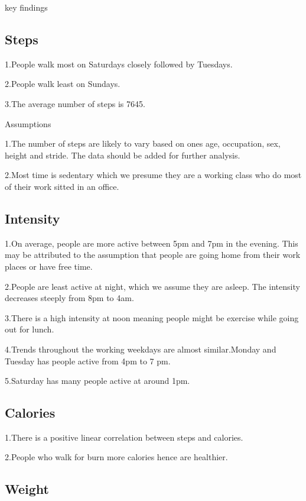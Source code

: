\documentclass[
]{article}
\begin{document}
key findings

\hypertarget{steps}{%
\subsection{Steps}\label{steps}}

1.People walk most on Saturdays closely followed by Tuesdays.

2.People walk least on Sundays.

3.The average number of steps is 7645.

Assumptions

1.The number of steps are likely to vary based on ones age, occupation,
sex, height and stride. The data should be added for further analysis.

2.Most time is sedentary which we presume they are a working class who
do most of their work sitted in an office.

\hypertarget{intensity}{%
\subsection{Intensity}\label{intensity}}

1.On average, people are more active between 5pm and 7pm in the evening.
This may be attributed to the assumption that people are going home from
their work places or have free time.

2.People are least active at night, which we assume they are asleep. The
intensity decreases steeply from 8pm to 4am.

3.There is a high intensity at noon meaning people might be exercise
while going out for lunch.

4.Trends throughout the working weekdays are almost similar.Monday and
Tuesday has people active from 4pm to 7 pm.

5.Saturday has many people active at around 1pm.

\hypertarget{calories}{%
\subsection{Calories}\label{calories}}

1.There is a positive linear correlation between steps and calories.

2.People who walk for burn more calories hence are healthier.

\hypertarget{weight}{%
\subsection{Weight}\label{weight}}
\end{document}
